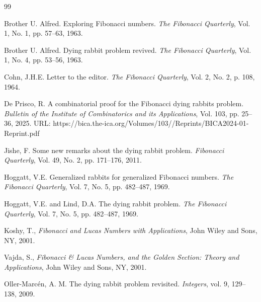 \documentclass[11pt,epsf]{article}
\begin{document}

\begin{thebibliography}{99}

Brother U. Alfred. Exploring Fibonacci numbers.
{\em The Fibonacci Quarterly}, Vol. 1, No. 1, pp. 57--63, 1963.

Brother U. Alfred. Dying rabbit problem revived.
{\em The Fibonacci Quarterly}, Vol. 1, No. 4, pp. 53--56, 1963.

Cohn, J.H.E. Letter to the editor.
{\em The Fibonacci Quarterly}, Vol. 2, No. 2, p. 108, 1964.

De Prisco, R.
A combinatorial proof for the Fibonacci dying rabbits problem.
{\em Bulletin of the Institute of Combinatorics and its Applications}, Vol. 103, pp. 25--36, 2025.
URL: https://bica.the-ica.org/Volumes/103//Reprints/BICA2024-01-Reprint.pdf

Jishe, F. 
Some new remarks about the dying rabbit problem. 
{\em Fibonacci Quarterly}, Vol. 49, No. 2, pp. 171–176, 2011.

Hoggatt, V.E. Generalized rabbits for generalized Fibonacci numbers.
{\em The Fibonacci Quarterly}, Vol. 7, No. 5, pp. 482--487, 1969.

Hoggatt, V.E. and Lind, D.A. The dying rabbit problem.
{\em The Fibonacci Quarterly}, Vol. 7, No. 5, pp. 482--487, 1969.

Koshy, T., {\em Fibonacci and Lucas Numbers with Applications},
John Wiley and Sons, NY, 2001.

Vajda, S., {\em Fibonacci \& Lucas Numbers, and the Golden Section: Theory and Applications},
John Wiley and Sons, NY, 2001.

Oller-Marcén, A. M. The dying rabbit problem revisited.
{\em Integers}, vol. 9, 129--138, 2009.

\end{thebibliography} 
\end{document}
